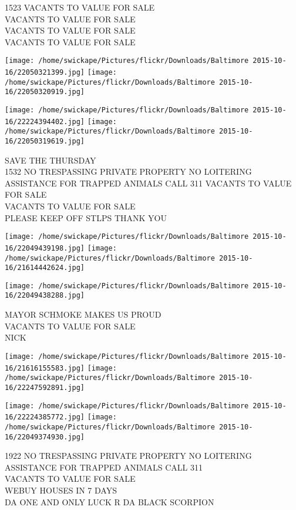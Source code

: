 \documentclass[10pt,letterpaper]{article}
\begin{document}
1523 VACANTS TO VALUE FOR SALE\\
VACANTS TO VALUE FOR SALE\\
VACANTS TO VALUE FOR SALE\\
VACANTS TO VALUE FOR SALE\\
\pagebreak

\texttt{[image: /home/swickape/Pictures/flickr/Downloads/Baltimore 2015-10-16/22050321399.jpg]}
\texttt{[image: /home/swickape/Pictures/flickr/Downloads/Baltimore 2015-10-16/22050320919.jpg]}

\texttt{[image: /home/swickape/Pictures/flickr/Downloads/Baltimore 2015-10-16/22224394402.jpg]}
\texttt{[image: /home/swickape/Pictures/flickr/Downloads/Baltimore 2015-10-16/22050319619.jpg]}

SAVE THE THURSDAY\\
1532 NO TRESPASSING PRIVATE PROPERTY NO LOITERING ASSISTANCE FOR TRAPPED ANIMALS CALL 311 VACANTS TO VALUE FOR SALE\\
VACANTS TO VALUE FOR SALE\\
PLEASE KEEP OFF STLPS THANK YOU\\
\pagebreak

\texttt{[image: /home/swickape/Pictures/flickr/Downloads/Baltimore 2015-10-16/22049439198.jpg]}
\texttt{[image: /home/swickape/Pictures/flickr/Downloads/Baltimore 2015-10-16/21614442624.jpg]}

\vspace{0.25in}
\texttt{[image: /home/swickape/Pictures/flickr/Downloads/Baltimore 2015-10-16/22049438288.jpg]}

MAYOR SCHMOKE MAKES US PROUD\\
VACANTS TO VALUE FOR SALE\\
NICK\\
\pagebreak

\texttt{[image: /home/swickape/Pictures/flickr/Downloads/Baltimore 2015-10-16/21616155583.jpg]}
\texttt{[image: /home/swickape/Pictures/flickr/Downloads/Baltimore 2015-10-16/22247592891.jpg]}

\texttt{[image: /home/swickape/Pictures/flickr/Downloads/Baltimore 2015-10-16/22224385772.jpg]}
\texttt{[image: /home/swickape/Pictures/flickr/Downloads/Baltimore 2015-10-16/22049374930.jpg]}

1922 NO TRESPASSING PRIVATE PROPERTY NO LOITERING ASSISTANCE FOR TRAPPED ANIMALS CALL 311\\
VACANTS TO VALUE FOR SALE\\
WEBUY HOUSES IN 7 DAYS\\
DA ONE AND ONLY LUCK R DA BLACK SCORPION\\
\pagebreak
\end{document}
